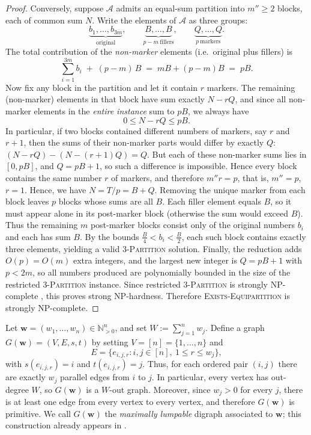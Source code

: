 \documentclass[a4paper,10pt]{amsart}
\theoremstyle{plain}
\theoremstyle{definition}
\begin{document}
\begin{proof}
Conversely, suppose $\mathcal A$ admits an equal-sum partition into $m''\ge2$ blocks, each of common sum $N$.
Write the elements of $\mathcal A$ as three groups:
\[
\underbrace{b_1,\dots,b_{3m}}_{\text{original}},\qquad
\underbrace{B,\dots,B}_{p-m\ \text{fillers}},\qquad
\underbrace{Q,\dots,Q}_{p\ \text{markers}}.
\]
The total contribution of the \emph{non-marker} elements (i.e.\ original plus fillers) is
\[
\sum_{i=1}^{3m} b_i \;+\; (p-m)\,B \;=\; mB + (p-m)B \;=\; pB.
\]
Now fix any block in the partition and let it contain $r$ markers. The remaining (non-marker) elements
in that block have sum exactly $N-rQ$, and since all non-marker elements in the \emph{entire instance}
sum to $pB$, we always have
\[
0 \le N-rQ \le pB.
\]
In particular, if two blocks contained different numbers of markers, say $r$ and $r+1$, then the sums of
their non-marker parts would differ by exactly $Q$: $(N-rQ) - (N-(r+1)Q) = Q.$
But each of these non-marker sums lies in $[0,pB]$, and $Q=pB+1$, so such a difference is impossible.
Hence every block contains the same number $r$ of markers, and therefore $m''r=p$, that is, $m''=p$, $r=1$. Hence, we have  $N=T/p=B+Q$. Removing the unique marker from each block leaves $p$ blocks whose sums are all $B$. Each filler element equals $B$, so it must appear alone in its post-marker block (otherwise the sum would exceed $B$).
Thus the remaining $m$ post-marker blocks consist only of the original numbers $b_i$ and each has sum $B$.
By the bounds $\frac{B}{4}<b_i<\frac{B}{2}$, each such block contains exactly three elements, yielding a valid
\textsc{3-Partition} solution. Finally, the reduction adds $O(p)=O(m)$ extra integers, and the largest new integer is $Q=pB+1$ with $p<2m$,
so all numbers produced are polynomially bounded in the size of the restricted \textsc{3-Partition} instance.
Since restricted \textsc{3-Partition} is strongly NP-complete , this proves strong NP-hardness.
Therefore \textsc{Exists-Equipartition} is strongly NP-complete.
\end{proof}
Let $\mathbf w=(w_1,\dots,w_n)\in\mathbb N^n_{>0}$, and set $W:=\sum_{j=1}^n w_j$. Define a graph $G(\mathbf w)=(V,E,s,t)$ by setting $V=[n]=\{1,\dots,n\}$ and
\[
E=\{e_{i,j,r}: i,j\in[n],\ 1\le r\le w_j\},
\]
with $s(e_{i,j,r})=i$ and $t(e_{i,j,r})=j$. Thus, for each ordered pair $(i,j)$ there are exactly $w_j$ parallel edges from $i$ to $j$. In particular, every vertex has out-degree $W$, so $G(\mathbf w)$ is a $W$-out graph. Moreover, since $w_j>0$ for every $j$, there is at least one edge from every vertex to every vertex, and therefore $G(\mathbf w)$ is primitive. We call $G(\mathbf w)$ the \emph{maximally lumpable} digraph associated to $\mathbf w$; this construction already appears in \cite[Theorem~8]{GuPri}.
\end{document}
